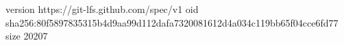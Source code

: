 version https://git-lfs.github.com/spec/v1
oid sha256:80f5897835315b4d9aa99d112dafa7320081612d4a034c119bb65f04cce6fd77
size 20207
